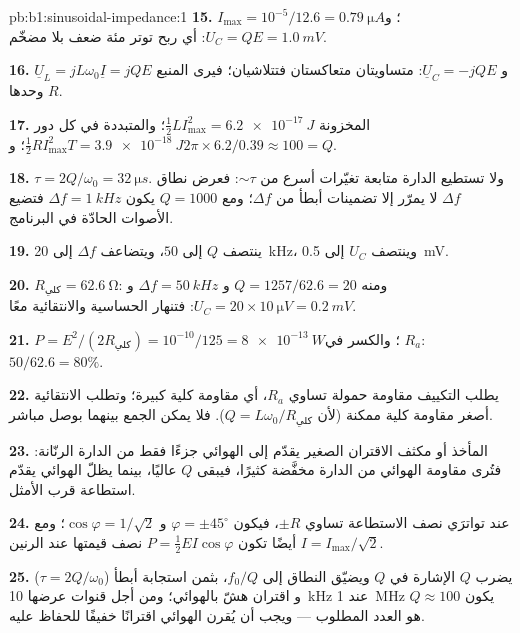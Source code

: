 \begin{solution}{pb:b1:sinusoidal-impedance:1}
\textbf{15.} $I_{\max} = 10^{-5}/12.6 = \qty{0.79}{\micro A}$؛ و$U_C = QE =
\qty{1.0}{mV}$: أي ربح توتر مئة ضعف بلا مضخّم.

\textbf{16.} $\underline U_L = jL\omega_0\underline I = jQE$ و $\underline U_C
= -jQE$: متساويتان متعاكستان فتتلاشيان؛ فيرى المنبع $R$ وحدها.

\textbf{17.} المخزونة $\tfrac12 LI_{\max}^2 = \qty{6.2e-17}{J}$؛ والمتبددة
في كل دور $\tfrac12 RI_{\max}^2T = \qty{3.9e-18}{J}$؛ و$2\pi \times 6.2/0.39
\approx 100 = Q$.

\textbf{18.} $\tau = 2Q/\omega_0 = \qty{32}{\micro s}$. ولا تستطيع الدارة
متابعة تغيّرات أسرع من $\sim\tau$: فعرض نطاق $\Delta f$ لا يمرّر
إلا تضمينات أبطأ من $\Delta f$؛ ومع $Q = 1000$ يكون $\Delta f =
\qty{1}{kHz}$ فتضيع الأصوات الحادّة في البرنامج.

\textbf{19.} ينتصف $Q$ إلى $50$، ويتضاعف $\Delta f$ إلى \qty{20}{kHz}، وينتصف $U_C$
إلى \qty{0.5}{mV}.

\textbf{20.} $R_{\text{كلي}} = \qty{62.6}{\ohm}$: ومنه $Q = 1257/62.6 = 20$ و
$\Delta f = \qty{50}{kHz}$ و $U_C = 20 \times \qty{10}{\micro V} = \qty{0.2}{mV}$:
فتنهار الحساسية والانتقائية معًا.

\textbf{21.} $P = E^2/(2R_{\text{كلي}}) = 10^{-10}/125 = \qty{8e-13}{W}$؛
والكسر في $R_a$: $50/62.6 = 80\%$.

\textbf{22.} يطلب التكييف مقاومة حمولة تساوي $R_a$، أي
مقاومة كلية كبيرة؛ وتطلب الانتقائية أصغر مقاومة كلية
ممكنة (لأن $Q = L\omega_0/R_{\text{كلي}}$). فلا يمكن الجمع بينهما بوصل
مباشر.

\textbf{23.} المأخذ أو مكثف الاقتران الصغير يقدّم إلى الهوائي
جزءًا فقط من الدارة الرنّانة: فتُرى مقاومة الهوائي
من الدارة مخفَّضة كثيرًا، فيبقى $Q$ عاليًا، بينما يظلّ
الهوائي يقدّم استطاعة قرب الأمثل.

\textbf{24.} عند تواترَي نصف الاستطاعة تساوي  $\pm R$،
فيكون $\varphi = \pm45^\circ$ و $\cos\varphi = 1/\sqrt2$؛ ومع $I =
I_{\max}/\sqrt2$ أيضًا تكون $P = \tfrac12 EI\cos\varphi$ نصف قيمتها
عند الرنين.

\textbf{25.} يضرب $Q$ الإشارة في $Q$ ويضيّق النطاق إلى
$f_0/Q$، بثمن استجابة أبطأ ($\tau = 2Q/\omega_0$) و
اقتران هشّ بالهوائي؛ ومن أجل قنوات عرضها \qty{10}{kHz} عند
\qty{1}{MHz} يكون $Q \approx 100$ هو العدد المطلوب --- ويجب أن يُقرن الهوائي
اقترانًا خفيفًا للحفاظ عليه.
\end{solution}

